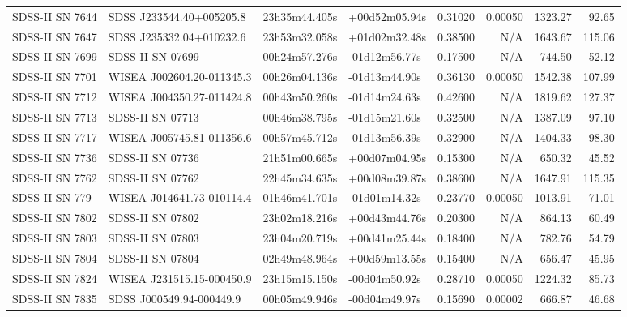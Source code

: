 \begin{longtable}{llllrrrr}
SDSS-II SN 7644  &        SDSS J233544.40+005205.8 &   23h35m44.405s &   +00d52m05.94s &  0.31020 &  0.00050 &  1323.27 &       92.65 \\
SDSS-II SN 7647  &        SDSS J235332.04+010232.6 &   23h53m32.058s &   +01d02m32.48s &  0.38500 &      N/A &  1643.67 &      115.06 \\
SDSS-II SN 7699  &                SDSS-II SN 07699 &   00h24m57.276s &   -01d12m56.77s &  0.17500 &      N/A &   744.50 &       52.12 \\
SDSS-II SN 7701  &       WISEA J002604.20-011345.3 &   00h26m04.136s &   -01d13m44.90s &  0.36130 &  0.00050 &  1542.38 &      107.99 \\
SDSS-II SN 7712  &       WISEA J004350.27-011424.8 &   00h43m50.260s &   -01d14m24.63s &  0.42600 &      N/A &  1819.62 &      127.37 \\
SDSS-II SN 7713  &                SDSS-II SN 07713 &   00h46m38.795s &   -01d15m21.60s &  0.32500 &      N/A &  1387.09 &       97.10 \\
SDSS-II SN 7717  &       WISEA J005745.81-011356.6 &   00h57m45.712s &   -01d13m56.39s &  0.32900 &      N/A &  1404.33 &       98.30 \\
SDSS-II SN 7736  &                SDSS-II SN 07736 &   21h51m00.665s &   +00d07m04.95s &  0.15300 &      N/A &   650.32 &       45.52 \\
SDSS-II SN 7762  &                SDSS-II SN 07762 &   22h45m34.635s &   +00d08m39.87s &  0.38600 &      N/A &  1647.91 &      115.35 \\
SDSS-II SN 779   &       WISEA J014641.73-010114.4 &   01h46m41.701s &   -01d01m14.32s &  0.23770 &  0.00050 &  1013.91 &       71.01 \\
SDSS-II SN 7802  &                SDSS-II SN 07802 &   23h02m18.216s &   +00d43m44.76s &  0.20300 &      N/A &   864.13 &       60.49 \\
SDSS-II SN 7803  &                SDSS-II SN 07803 &   23h04m20.719s &   +00d41m25.44s &  0.18400 &      N/A &   782.76 &       54.79 \\
SDSS-II SN 7804  &                SDSS-II SN 07804 &   02h49m48.964s &   +00d59m13.55s &  0.15400 &      N/A &   656.47 &       45.95 \\
SDSS-II SN 7824  &       WISEA J231515.15-000450.9 &   23h15m15.150s &   -00d04m50.92s &  0.28710 &  0.00050 &  1224.32 &       85.73 \\
SDSS-II SN 7835  &        SDSS J000549.94-000449.9 &   00h05m49.946s &   -00d04m49.97s &  0.15690 &  0.00002 &   666.87 &       46.68 \\

\end{longtable}

